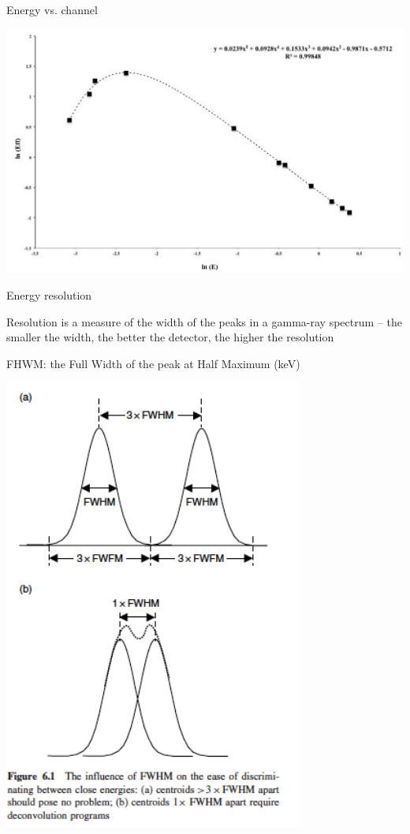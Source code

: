 \begin{frame}{Energy vs. channel}

\centering
\includegraphics[scale=0.25]{figures/efficiency_energy_laruc.png}

\end{frame}

\begin{frame}{Energy resolution}

\alert{Resolution is a measure of the width of the peaks in a gamma-ray spectrum – the smaller the width, the better the detector, the higher the resolution}

\alert{FHWM: the Full Width of the peak at Half Maximum (keV)}

\centering
\includegraphics[scale=0.25]{figures/fhwm.png}

\end{frame}

